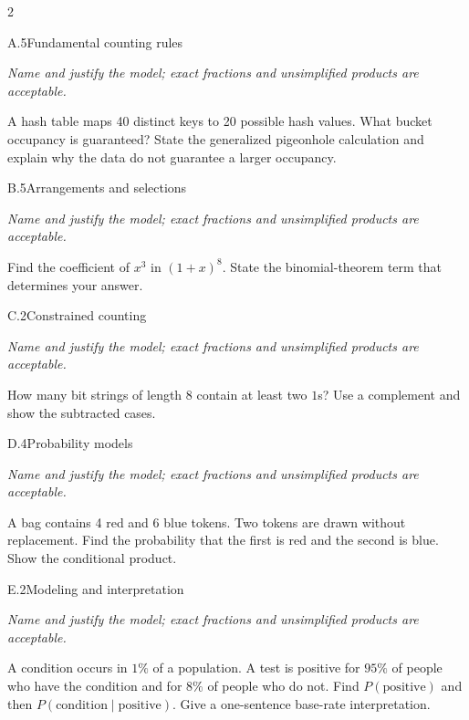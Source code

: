 \documentclass[9pt]{extarticle}
\begin{document}
\CoreWorkArea
\FormBreak
{}
\begin{multicols}{2}
\begin{CoreProblem}{A.5}{Fundamental counting rules}
{\scriptsize\textit{Name and justify the model; exact fractions and unsimplified products are acceptable.}\par}
A hash table maps 40 distinct keys to 20 possible hash values. What
    bucket occupancy is guaranteed? State the generalized pigeonhole calculation
    and explain why the data do not guarantee a larger occupancy.
\end{CoreProblem}
\begin{CoreProblem}{B.5}{Arrangements and selections}
{\scriptsize\textit{Name and justify the model; exact fractions and unsimplified products are acceptable.}\par}
Find the coefficient of $x^3$ in $(1+x)^8$. State the binomial-theorem
    term that determines your answer.
\end{CoreProblem}
\begin{CoreProblem}{C.2}{Constrained counting}
{\scriptsize\textit{Name and justify the model; exact fractions and unsimplified products are acceptable.}\par}
How many bit strings of length 8 contain at least two $1$s? Use a
    complement and show the subtracted cases.
\end{CoreProblem}
\columnbreak
\begin{CoreProblem}{D.4}{Probability models}
{\scriptsize\textit{Name and justify the model; exact fractions and unsimplified products are acceptable.}\par}
A bag contains 4 red and 6 blue tokens. Two tokens are drawn without
    replacement. Find the probability that the first is red and the second is
    blue. Show the conditional product.
\end{CoreProblem}
\begin{CoreProblem}{E.2}{Modeling and interpretation}
{\scriptsize\textit{Name and justify the model; exact fractions and unsimplified products are acceptable.}\par}
A condition occurs in $1\%$ of a population. A test is positive for
    $95\%$ of people who have the condition and for $8\%$ of people who do not.
    Find $P(\text{positive})$ and then
    $P(\text{condition}\mid\text{positive})$. Give a one-sentence base-rate
    interpretation.
\end{CoreProblem}
\end{multicols}
\end{document}
